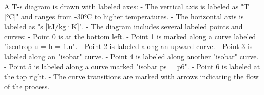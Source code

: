 A T-s diagram is drawn with labeled axes:  
- The vertical axis is labeled as "T [°C]" and ranges from -30°C to higher temperatures.  
- The horizontal axis is labeled as "s [kJ/kg·K]".  
- The diagram includes several labeled points and curves:  
  - Point 0 is at the bottom left.  
  - Point 1 is marked along a curve labeled "isentrop u = h = 1.u".  
  - Point 2 is labeled along an upward curve.  
  - Point 3 is labeled along an "isobar" curve.  
  - Point 4 is labeled along another "isobar" curve.  
  - Point 5 is labeled along a curve marked "isobar ps = p6".  
  - Point 6 is labeled at the top right.  
- The curve transitions are marked with arrows indicating the flow of the process.